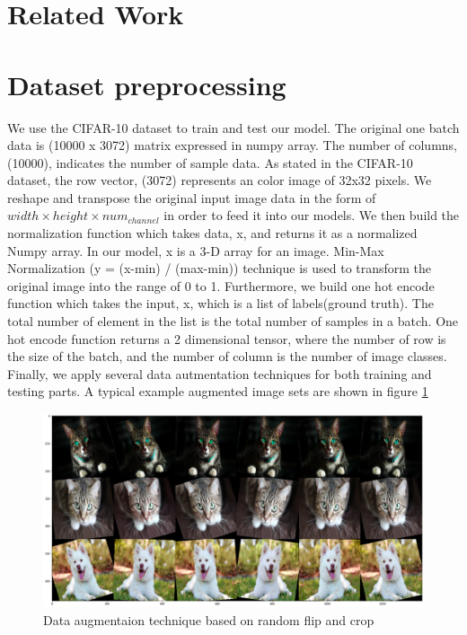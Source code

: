 \documentclass[11pt]{scrartcl}
\begin{document}



\section{Related Work}


\section{Dataset preprocessing}
We use the CIFAR-10 dataset to train and test our model. The original one batch data is (10000 x 3072) matrix expressed in numpy array. The number of columns, (10000), indicates the number of sample data. As stated in the CIFAR-10 dataset, the row vector, (3072) represents an color image of 32x32 pixels. 
We reshape and transpose the original input image data in the form of $width \times height \times num_{channel}$ in order to feed it into our models.
We then build the normalization function which takes data, x, and returns it as a normalized Numpy array. In our model, x is a  3-D array for an image. Min-Max Normalization (y = (x-min) / (max-min)) technique is used to transform the original image into the range of 0 to 1. 
Furthermore, we build one hot encode function which takes the input, x, which is a list of labels(ground truth). The total number of element in the list is the total number of samples in a batch. One hot encode function returns a 2 dimensional tensor, where the number of row is the size of the batch, and the number of column is the number of image classes.
Finally, we apply several data autmentation techniques for both training and testing parts. A typical example augmented image sets are shown in figure \ref{data_aug}

\begin{figure}[H]
	\centering
	\includegraphics[width=0.9\linewidth]{fig/random_flip_crop_padding.png}
	\caption{Data augmentaion technique based on random flip and crop}
	\label{data_aug}
\end{figure}
\end{document}

